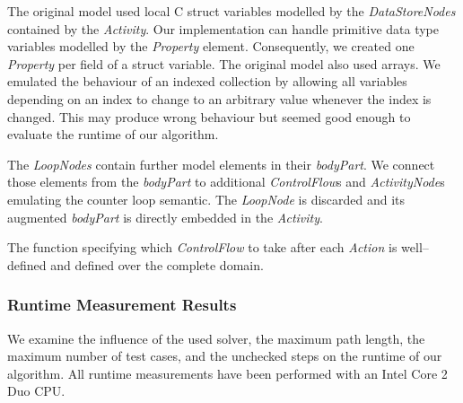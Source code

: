 \documentclass[runningheads,a4paper]{llncs}%
\newcommand{\UMLType}[1]{\textsf{\textit{#1}}} %
\newcommand{\UMLReference}[1]{\textsf{\textit{#1}}} %
\begin{document}
The original model used local C struct variables modelled by the \UMLType{DataStoreNodes} contained by the \UMLType{Activity}. Our implementation can handle primitive data type variables modelled by the \UMLType{Property} element. Consequently, we created one \UMLType{Property} per field of a struct variable. The original model also used arrays. We emulated the behaviour of an indexed collection by allowing all variables depending on an index to change to an arbitrary value whenever the index is changed. This may produce wrong behaviour but seemed good %
enough to evaluate the runtime of our algorithm.

The \UMLType{LoopNodes} contain further model elements in their \UMLReference{bodyPart}. We connect those elements from the \UMLReference{bodyPart} to additional \UMLType{ControlFlow}s and \UMLType{ActivityNode}s emulating the counter loop semantic. The \UMLType{LoopNode} is discarded and its augmented \UMLReference{bodyPart} is directly embedded in the \UMLType{Activity}.%


The function specifying which \UMLType{ControlFlow} to take after each \UMLType{Action} is well--defined and defined over the complete domain.%
\subsubsection{Runtime Measurement Results}%
We examine the influence of the used solver, the maximum path length, the maximum number of test cases, and the unchecked steps on the runtime of our algorithm. All runtime measurements have been performed with an Intel\textsuperscript{\textregistered} Core\textsuperscript{\texttrademark} 2 Duo CPU.%
\end{document}
